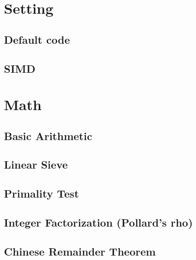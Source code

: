 \documentclass[8pt,landscape,a4paper,twocolumn]{article}
\begin{document}
\tableofcontents


\section{Setting}

\subsection{Default code}


\subsection{SIMD}



\section{Math}

\subsection{Basic Arithmetic}


\subsection{Linear Sieve}


\subsection{Primality Test}


\subsection{Integer Factorization (Pollard's rho)}


\subsection{Chinese Remainder Theorem}


\end{document}
